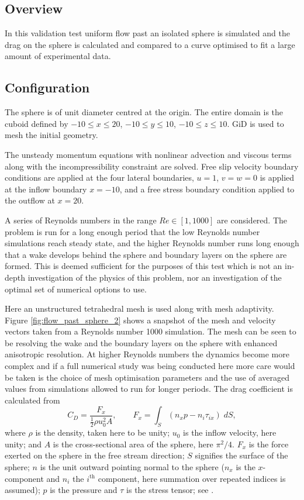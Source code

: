 \subsection{Overview}
In this validation test uniform flow past an isolated sphere is simulated
and the drag on the sphere is calculated and compared to a curve optimised
to fit a large amount of experimental data.

\subsection{Configuration}
The sphere is of unit diameter centred at the origin. The entire domain is
the cuboid defined by $-10\le x\le 20$, $-10\le y\le 10$, $-10\le z\le 10$.
GiD is used to mesh the initial geometry.

The unsteady momentum equations with nonlinear advection and viscous terms
along with the incompressibility constraint are solved. Free slip velocity
boundary conditions are applied at the four lateral boundaries, $u=1$, $v=w=0$ is
applied at the inflow boundary $x=-10$, and a free stress boundary condition
applied to the outflow at $x=20$. 

A series of Reynolds numbers in the range
$Re\in [1,1000]$ are considered. The problem is run for a long enough
period that the low Reynolds number simulations reach steady state, and the
higher Reynolds number runs long enough that a wake develops behind the
sphere and boundary layers on the sphere are formed.  This is deemed
sufficient for the purposes of this test which is not an in-depth
investigation of the physics of this problem, nor an investigation of the optimal
set of numerical options to use. 

Here an unstructured
tetrahedral mesh is used along with mesh adaptivity. 
Figure \ref{fig:flow_past_sphere_2} shows a snapshot of the
mesh and velocity vectors taken from a Reynolds number 1000 simulation. The
mesh can be seen to be resolving the wake and the boundary layers on the
sphere with enhanced anisotropic resolution. At higher Reynolds numbers the
dynamics become more complex and if a full numerical study was being
conducted here more care would be taken is the choice of mesh optimisation
parameters and the use of averaged values from simulations allowed to run
for longer periods. The drag coefficient is calculated from
\begin{equation}
C_D = \frac{F_x}{\frac{1}{2}\rho u_0^2 A},\qquad F_x = \int_S (n_xp - n_i\tau_{ix})\;dS,
\label{eqn:drag_coeff}
\end{equation}
where $\rho$ is the density, taken here to be unity; 
$u_0$ is the inflow velocity, here unity; 
and $A$ is the cross-sectional area of the sphere, here $\pi^2/4$. 
$F_x$ is the force 
exerted on the sphere in the free stream direction;
$S$ signifies the surface of the sphere; $n$ is the 
unit outward pointing normal to the sphere 
($n_x$ is the $x$-component and $n_i$ the $i^{\textrm{th}}$ 
component, here summation over repeated indices is assumed); 
$p$ is the pressure and $\tau$ is the stress tensor;
see \citet{panton2006}.

